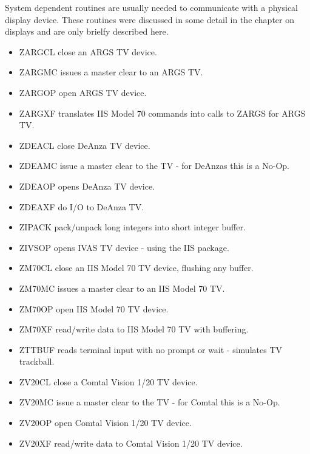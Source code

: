 System dependent routines are usually needed to communicate with a
physical display device.  These routines were discussed in some detail
in the chapter on displays and are only brielfy described here.
\begin{itemize} %
\item ZARGCL  close an ARGS TV device.
\item ZARGMC  issues a master clear to an ARGS TV.
\item ZARGOP  open ARGS TV device.
\item ZARGXF  translates IIS Model 70 commands into
calls to ZARGS for ARGS TV.
\item ZDEACL  close DeAnza TV device.
\item ZDEAMC  issue a master clear to the TV - for
DeAnzas this is a No-Op.
\item ZDEAOP  opens DeAnza TV device.
\item ZDEAXF  do I/O to DeAnza TV.
\item ZIPACK  pack/unpack long integers into short
integer buffer.
\item ZIVSOP  opens IVAS TV device - using the IIS
package.
\item ZM70CL  close an IIS Model 70 TV device, flushing
any buffer.
\item ZM70MC  issues a master clear to an IIS Model 70
TV.
\item ZM70OP  open IIS Model 70 TV device.
\item ZM70XF  read/write data to IIS Model 70 TV with
buffering.
\item ZTTBUF  reads terminal input with no prompt or
wait - simulates TV trackball.
\item ZV20CL  close a Comtal Vision 1/20 TV device.
\item ZV20MC  issue a master clear to the TV - for
Comtal this is a No-Op.
\item ZV20OP  open Comtal Vision 1/20 TV device.
\item ZV20XF  read/write data to Comtal Vision 1/20 TV
device.
\end{itemize} %

